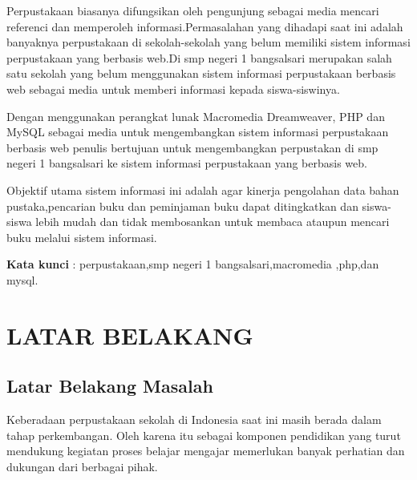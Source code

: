 \documentclass{jtetiproposalskripsi}
\begin{document}
\cover

\approvalpage


\begin{abstractind}
Perpustakaan biasanya difungsikan oleh pengunjung sebagai media mencari referenci dan memperoleh informasi.Permasalahan yang dihadapi saat ini adalah banyaknya perpustakaan di sekolah-sekolah yang belum memiliki sistem informasi perpustakaan yang berbasis web.Di smp negeri 1 bangsalsari merupakan salah satu sekolah yang belum menggunakan sistem informasi perpustakaan berbasis web sebagai media untuk memberi informasi kepada siswa-siswinya.

Dengan menggunakan perangkat lunak  Macromedia Dreamweaver, PHP dan MySQL  sebagai media untuk mengembangkan sistem informasi perpustakaan berbasis web penulis bertujuan untuk mengembangkan perpustakan di smp negeri 1 bangsalsari ke sistem informasi perpustakaan yang berbasis web.

Objektif utama sistem informasi ini adalah agar kinerja pengolahan data bahan pustaka,pencarian buku dan peminjaman buku dapat ditingkatkan dan siswa-siswa lebih mudah dan tidak membosankan untuk membaca ataupun mencari buku melalui sistem informasi.


\bigskip
\textbf{Kata kunci} : perpustakaan,smp negeri 1 bangsalsari,macromedia ,php,dan mysql.
\end{abstractind}

\tableofcontents
{}
\clearpage{}\setcounter{page}{1}

\chapter{LATAR BELAKANG}

\section{Latar Belakang Masalah}
Keberadaan perpustakaan sekolah di Indonesia saat ini masih berada dalam tahap perkembangan. Oleh karena itu sebagai komponen pendidikan yang turut mendukung kegiatan proses belajar mengajar memerlukan banyak perhatian dan dukungan dari berbagai pihak.
\end{document}
